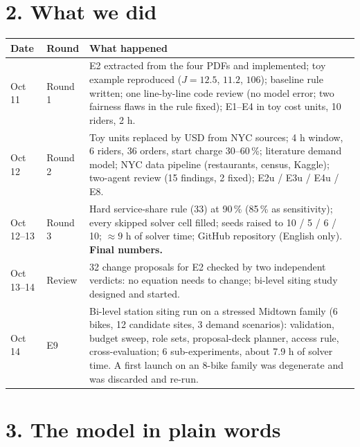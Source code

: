 \section*{2. What we did}
\begin{center}\small
\begin{tabular}{@{}L{1.6cm}L{1.6cm}L{11.7cm}@{}}
\toprule
Date & Round & What happened \\
\midrule
Oct 11 & Round 1 & E2 extracted from the four PDFs and implemented; toy example reproduced ($J=12.5$, $11.2$, $106$); baseline rule written; one line-by-line code review (no model error; two fairness flaws in the rule fixed); E1--E4 in toy cost units, 10 riders, 2 h. \\
Oct 12 & Round 2 & Toy units replaced by USD from NYC sources; 4 h window, 6 riders, 36 orders, start charge 30--60\,\%; literature demand model; NYC data pipeline (restaurants, census, Kaggle); two-agent review (15 findings, 2 fixed); E2u / E3u / E4u / E8. \\
Oct 12--13 & Round 3 & Hard service-share rule (33) at 90\,\% (85\,\% as sensitivity); every skipped solver cell filled; seeds raised to 10 / 5 / 6 / 10; $\approx 9$ h of solver time; GitHub repository (English only). \textbf{Final numbers.} \\
Oct 13--14 & Review & 32 change proposals for E2 checked by two independent verdicts: no equation needs to change; bi-level siting study designed and started. \\
Oct 14 & E9 & Bi-level station siting run on a stressed Midtown family (6 bikes, 12 candidate sites, 3 demand scenarios): validation, budget sweep, role sets, proposal-deck planner, access rule, cross-evaluation; 6 sub-experiments, about 7.9 h of solver time. A first launch on an 8-bike family was degenerate and was discarded and re-run. \\
\bottomrule
\end{tabular}
\end{center}

\section*{3. The model in plain words}

